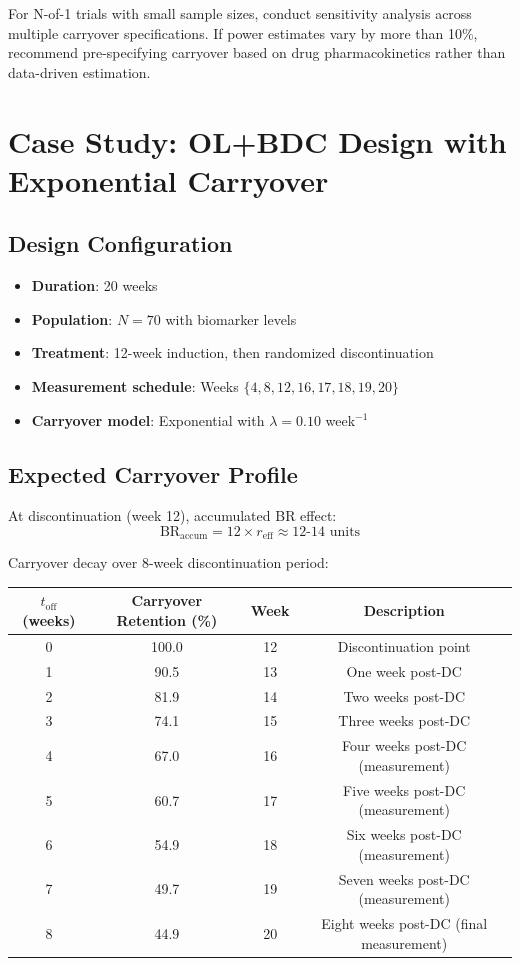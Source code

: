 \documentclass[11pt,a4paper]{article}
\begin{document}
For N-of-1 trials with small sample sizes, conduct sensitivity analysis across multiple carryover specifications. If power estimates vary by more than 10\%, recommend pre-specifying carryover based on drug pharmacokinetics rather than data-driven estimation.

\section{Case Study: OL+BDC Design with Exponential Carryover}
\label{sec:casestudy}

\subsection{Design Configuration}

\begin{itemize}
  \item \textbf{Duration}: 20 weeks
  \item \textbf{Population}: $N=70$ with biomarker levels
  \item \textbf{Treatment}: 12-week induction, then randomized discontinuation
  \item \textbf{Measurement schedule}: Weeks $\{4, 8, 12, 16, 17, 18, 19, 20\}$
  \item \textbf{Carryover model}: Exponential with $\lambda = 0.10$ week$^{-1}$
\end{itemize}

\subsection{Expected Carryover Profile}

At discontinuation (week 12), accumulated BR effect:
\begin{equation}
  \text{BR}_{\text{accum}} = 12 \times r_{\text{eff}} \approx 12\text{-}14 \text{ units}
\end{equation}

Carryover decay over 8-week discontinuation period:

\begin{center}
\begin{tabular}{cccc}
  \toprule
  $t_{\text{off}}$ (weeks) & Carryover Retention (\%) & Week & Description \\
  \midrule
  0 & 100.0 & 12 & Discontinuation point \\
  1 & 90.5 & 13 & One week post-DC \\
  2 & 81.9 & 14 & Two weeks post-DC \\
  3 & 74.1 & 15 & Three weeks post-DC \\
  4 & 67.0 & 16 & Four weeks post-DC (measurement) \\
  5 & 60.7 & 17 & Five weeks post-DC (measurement) \\
  6 & 54.9 & 18 & Six weeks post-DC (measurement) \\
  7 & 49.7 & 19 & Seven weeks post-DC (measurement) \\
  8 & 44.9 & 20 & Eight weeks post-DC (final measurement) \\
  \bottomrule
\end{tabular}
\end{center}
\end{document}
